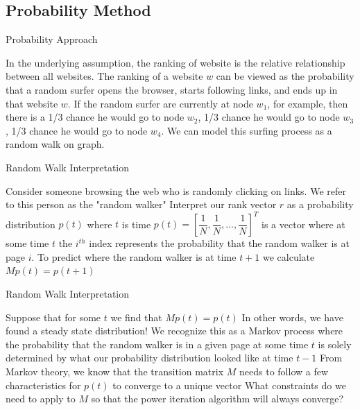 \documentclass{beamer}
\begin{document}
\subsection{Probability Method}
\begin{frame}[t]{Probability Approach}
    \begin{outline}
        \1 In the underlying assumption, the ranking of website is the relative relationship between all websites. 
        \1 The ranking of a website $w$ can be viewed as the probability that a random surfer opens the browser, starts following links, and ends up in that website $w$.
        \1 If the random surfer are currently at node $w_1$, for example, then there is a 1/3 chance he would go to node $w_2$, 1/3 chance he would go to node $w_3$, 1/3 chance he would go to node $w_4$. 
        \1 We can model this surfing process as a random walk on graph. 
    \end{outline}
\end{frame}

\begin{frame}[t]{Random Walk Interpretation}
    \begin{outline}
        \1 Consider someone browsing the web who is randomly clicking on links. We refer to this person as the "random walker" 
        \1 Interpret our rank vector $r$ as a probability distribution $p(t)$ where $t$ is time
        \1 $p(t) = \left[ \dfrac{1}{N}, \dfrac{1}{N}, \ldots, \dfrac{1}{N} \right]^T$ is a vector where at some time $t$ the $i^{th}$ index represents the probability that the random walker is at page $i$.
        \1 To predict where the random walker is at time $t + 1$ we calculate $Mp(t) = p(t + 1)$
    \end{outline}
\end{frame}

\begin{frame}[t]{Random Walk Interpretation}
\begin{outline}
    \1 Suppose that for some $t$ we find that $Mp(t) = p(t)$
    \1 In other words, we have found a steady state distribution!
    \1 We recognize this as a Markov process where the probability that the random walker is in a given page at some time $t$ is solely determined by what our probability distribution looked like at time $t-1$
    \1 From Markov theory, we know that the transition matrix $M$ needs to follow a few characteristics for $p(t)$ to converge to a unique vector
    \1 What constraints do we need to apply to $M$ so that the power iteration algorithm will always converge?
\end{outline}   
\end{frame}
\end{document}
